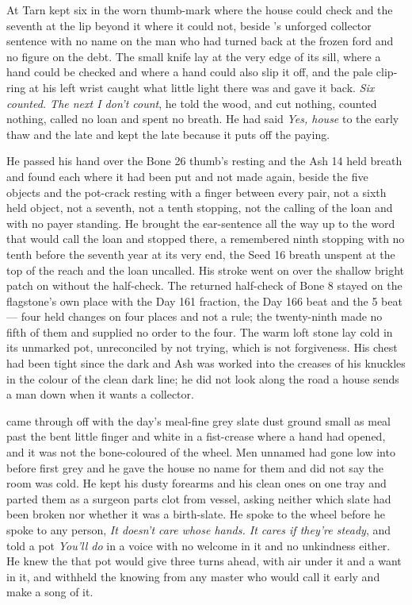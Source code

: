 \scenebreak

At  Tarn kept six in the worn thumb-mark where the house could check and the seventh at the lip beyond it where it could not, beside 's unforged collector sentence with no name on the man who had turned back at the frozen ford and no figure on the debt. The small knife lay at the very edge of its sill, where a hand could be checked and where a hand could also slip it off, and the pale clip-ring at his left wrist caught what little light there was and gave it back. \emph{Six counted. The next I don't count}, he told the wood, and cut nothing, counted nothing, called no loan and spent no breath. He had said \emph{Yes, house} to the early thaw and the late and kept the late because it puts off the paying.

He passed his hand over the Bone 26 thumb's resting and the Ash 14 held breath and found each where it had been put and not made again, beside the five objects and the pot-crack resting with a finger between every pair, not a sixth held object, not a seventh, not a tenth stopping, not the calling of the loan and with no payer standing. He brought the ear-sentence all the way up to the word that would call the loan and stopped there, a remembered ninth stopping with no tenth before the seventh year at its very end, the Seed 16 breath unspent at the top of the reach and the loan uncalled. His stroke went on over the shallow bright patch on  without the half-check. The returned half-check of Bone 8 stayed on the flagstone's own place with the Day 161 fraction, the Day 166 beat and the  5 beat --- four held changes on four places and not a rule; the twenty-ninth made no fifth of them and supplied no order to the four. The warm loft stone lay cold in its unmarked pot, unreconciled by not trying, which is not forgiveness. His chest had been tight since the dark and Ash was worked into the creases of his knuckles in the colour of the clean dark line; he did not look along the road a house sends a man down when it wants a collector.

\scenebreak

 came through  off  with the day's meal-fine grey slate dust ground small as meal past the bent little finger and white in a fist-crease where a hand had opened, and it was not the bone-coloured  of the wheel. Men unnamed had gone low into  before first grey and he gave the house no name for them and did not say the room was cold. He kept his dusty forearms and his clean ones on one tray and parted them as a surgeon parts clot from vessel, asking neither which slate had been broken nor whether it was a birth-slate. He spoke to the wheel before he spoke to any person, \emph{It doesn't care whose hands. It cares if they're steady}, and told a pot \emph{You'll do} in a voice with no welcome in it and no unkindness either. He knew the  that pot would give three turns ahead, with air under it and a want in it, and withheld the knowing from any  master who would call it early and make a song of it.

